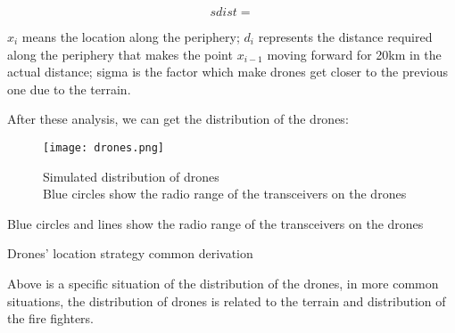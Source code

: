 \documentclass[../main]{subfiles}
\begin{document}
\begin{equation}
sdist=
\end{equation}

\(x_i\) means the location along the periphery; \(d_i\) represents the
distance required along the periphery that makes the point \(x_{i-1}\)
moving forward for 20km in the actual distance; sigma is the factor
which make drones get closer to the previous one due to the terrain.

After these analysis, we can get the distribution of the drones:

\begin{figure}[h!]
      \centering
      \captionsetup{justification=centering}
      \texttt{[image: drones.png]}
      \caption{Simulated distribution of drones \\ Blue circles show the radio range of the transceivers on the
drones}
      \end{figure}
      
Blue circles and lines show the radio range of the transceivers on the
drones

Drones' location strategy common derivation

Above is a specific situation of the distribution of the drones, in more
common situations, the distribution of drones is related to the terrain
and distribution of the fire fighters.
\end{document}

